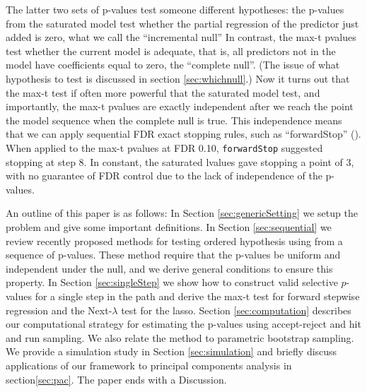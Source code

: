 \documentclass{article}
\begin{document}
The latter two sets of p-values test someone different hypotheses:  the p-values from the saturated model test whether the partial regression of the predictor just added is zero,
what we call the ``incremental null''
In contrast, the max-t pvalues test whether the current model is adequate, that is, all predictors not in the model  have coefficients equal to zero,
the ``complete null''. (The issue of what hypothesis to test is discussed in section \ref{sec:whichnull}.)
Now it turns out that the max-t test if often more powerful that the saturated model test, and importantly, the max-t pvalues are exactly
independent after we reach the point the model sequence when the complete null is true. This independence means that we can apply
sequential FDR exact stopping rules, such as ``forwardStop'' (\citet{gsell2013sequential}). When applied to the max-t pvalues at FDR 0.10, {\tt forwardStop}
suggested stopping at step 8. In constant, the saturated lvalues gave stopping a point of 3, with no guarantee of FDR control
due to the lack of independence of the p-values.

An outline of this paper is as follows:
In Section \ref{sec:genericSetting} we setup the problem and give some important definitions. In Section \ref{sec:sequential} we review recently proposed methods for
testing ordered hypothesis using from a sequence of p-values. These method require that the p-values be uniform and independent under the null, and we derive general conditions
to ensure this property. In Section \ref{sec:singleStep}  we  show how to construct valid selective $p$-values for a single step in the path and derive the max-t test
for  forward stepwise regression and the Next-$\lambda$ test for the lasso. Section \ref{sec:computation}  describes our computational strategy for estimating the p-values using accept-reject and hit and run sampling. We also relate the method to parametric bootstrap sampling. We provide a simulation study in Section \ref{sec:simulation} and briefly discuss applications of our framework to
principal components analysis in section\ref{sec:pac}. The paper ends with a Discussion.



\end{document}

